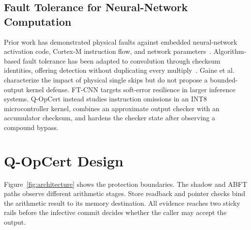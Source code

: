 \documentclass[conference]{IEEEtran}
\begin{document}
\subsection{Fault Tolerance for Neural-Network Computation}
Prior work has demonstrated physical faults against embedded neural-network activation code, Cortex-M instruction flow, and network parameters~\cite{breier2018deeplaser,gaine2023embedded,yao2020deephammer}. Algorithm-based fault tolerance has been adapted to convolution through checksum identities, offering detection without duplicating every multiply~\cite{zhao2021ftcnn}. Gaine et al. characterize the impact of physical single skips but do not propose a bounded-output kernel defense. FT-CNN targets soft-error resilience in larger inference systems. Q-OpCert instead studies instruction omissions in an INT8 microcontroller kernel, combines an approximate output checker with an accumulator checksum, and hardens the checker state after observing a compound bypass.

\section{Q-OpCert Design}
Figure~\ref{fig:architecture} shows the protection boundaries. The shadow and ABFT paths observe different arithmetic stages. Store readback and pointer checks bind the arithmetic result to its memory destination. All evidence reaches two sticky rails before the infective commit decides whether the caller may accept the output.
\end{document}
